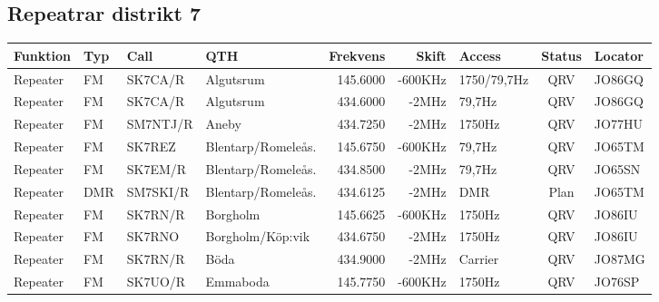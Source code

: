 \begin{landscape}
\subsection{Repeatrar distrikt 7}
\footnotesize
\begin{longtable}{llllrrlcl}
	\textbf{Funktion}         & \textbf{Typ}  & \textbf{Call} & \textbf{QTH}        & \textbf{Frekvens} & \textbf{Skift} & \textbf{Access}  & \textbf{Status} & \textbf{Locator} \\ \hline
\endhead
	Repeater                  & FM            & SK7CA/R       & Algutsrum           & 145.6000          & -600KHz        & 1750/79,7Hz      & QRV             & JO86GQ           \\
	Repeater                  & FM            & SK7CA/R       & Algutsrum           & 434.6000          & -2MHz          & 79,7Hz           & QRV             & JO86GQ           \\
	Repeater                  & FM            & SM7NTJ/R      & Aneby               & 434.7250          & -2MHz          & 1750Hz           & QRV             & JO77HU           \\
	Repeater                  & FM            & SK7REZ        & Blentarp/Romeleås.  & 145.6750          & -600KHz        & 79,7Hz           & QRV             & JO65TM           \\
	Repeater                  & FM            & SK7EM/R       & Blentarp/Romeleås.  & 434.8500          & -2MHz          & 79,7Hz           & QRV             & JO65SN           \\
	Repeater                  & DMR           & SM7SKI/R      & Blentarp/Romeleås.  & 434.6125          & -2MHz          & DMR              & Plan            & JO65TM           \\
	Repeater                  & FM            & SK7RN/R       & Borgholm            & 145.6625          & -600KHz        & 1750Hz           & QRV             & JO86IU           \\
	Repeater                  & FM            & SK7RNO        & Borgholm/Köp:vik    & 434.6750          & -2MHz          & 1750Hz           & QRV             & JO86IU           \\
	Repeater                  & FM            & SK7RN/R       & Böda                & 434.9000          & -2MHz          & Carrier          & QRV             & JO87MG           \\
	Repeater                  & FM            & SK7UO/R       & Emmaboda            & 145.7750          & -600KHz        & 1750Hz           & QRV             & JO76SP           \\

\end{longtable}
\end{landscape}
